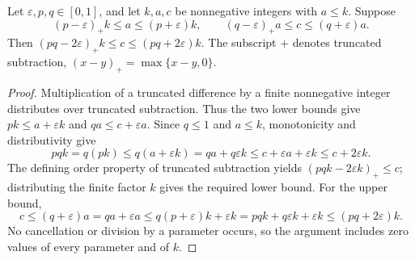 \begin{lemma}
Let $\varepsilon,p,q\in[0,1]$, and let $k,a,c$ be nonnegative integers with $a\leq k$.
Suppose
\[
 (p-\varepsilon)_+k\leq a\leq(p+\varepsilon)k,
 \qquad(q-\varepsilon)_+a\leq c\leq(q+\varepsilon)a.
\]
Then $(pq-2\varepsilon)_+k\leq c\leq(pq+2\varepsilon)k$.
The subscript $+$ denotes truncated subtraction, $(x-y)_+=\max\{x-y,0\}$.
\end{lemma}
\begin{proof}
Multiplication of a truncated difference by a finite nonnegative integer distributes over truncated subtraction.
Thus the two lower bounds give $pk\leq a+\varepsilon k$ and $qa\leq c+\varepsilon a$.
Since $q\leq1$ and $a\leq k$, monotonicity and distributivity give
\[
 pqk=q(pk)\leq q(a+\varepsilon k)
 =qa+q\varepsilon k\leq c+\varepsilon a+\varepsilon k
 \leq c+2\varepsilon k.
\]
The defining order property of truncated subtraction yields $(pqk-2\varepsilon k)_+\leq c$; distributing the finite factor $k$ gives the required lower bound.
For the upper bound,
\[
 c\leq(q+\varepsilon)a=qa+\varepsilon a
 \leq q(p+\varepsilon)k+\varepsilon k
 =pqk+q\varepsilon k+\varepsilon k
 \leq(pq+2\varepsilon)k.
\]
No cancellation or division by a parameter occurs, so the argument includes zero values of every parameter and of $k$.
\end{proof}

